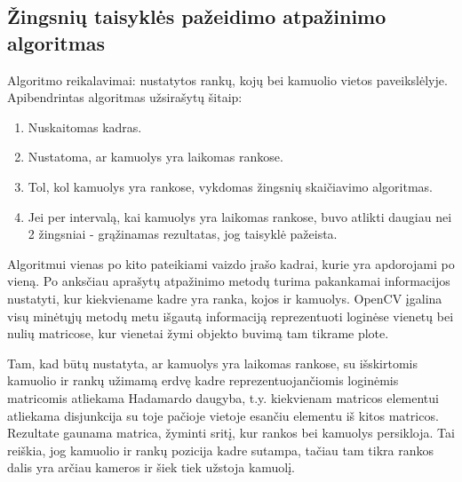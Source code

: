 \documentclass{VUMIFPSbakalaurinis}
\begin{document}
\subsection{Žingsnių taisyklės pažeidimo atpažinimo algoritmas}

Algoritmo reikalavimai: nustatytos rankų, kojų bei kamuolio vietos paveikslėlyje. Apibendrintas algoritmas užsirašytų šitaip: 

\begin{enumerate}
	\item Nuskaitomas kadras.
	\item Nustatoma, ar kamuolys yra laikomas rankose.
	\item Tol, kol kamuolys yra rankose, vykdomas žingsnių skaičiavimo algoritmas.
	\item Jei per intervalą, kai kamuolys yra laikomas rankose, buvo atlikti daugiau nei 2 žingsniai - grąžinamas rezultatas, jog taisyklė pažeista.
\end{enumerate}

  
Algoritmui vienas po kito pateikiami vaizdo įrašo kadrai, kurie yra apdorojami po vieną. Po anksčiau aprašytų atpažinimo metodų turima pakankamai informacijos nustatyti, kur kiekviename kadre yra ranka, kojos ir kamuolys. OpenCV įgalina visų minėtųjų metodų metu išgautą informaciją reprezentuoti loginėse vienetų bei nulių matricose, kur vienetai žymi objekto buvimą tam tikrame plote. 

Tam, kad būtų nustatyta, ar kamuolys yra laikomas rankose, su išskirtomis kamuolio ir rankų užimamą erdvę kadre reprezentuojančiomis loginėmis matricomis atliekama Hadamardo daugyba, t.y. kiekvienam matricos elementui atliekama disjunkcija su toje pačioje vietoje esančiu elementu iš kitos matricos. Rezultate gaunama matrica, žyminti sritį, kur rankos bei kamuolys persikloja. Tai reiškia, jog kamuolio ir rankų pozicija kadre sutampa, tačiau tam tikra rankos dalis yra arčiau kameros ir šiek tiek užstoja kamuolį. 
\end{document}
